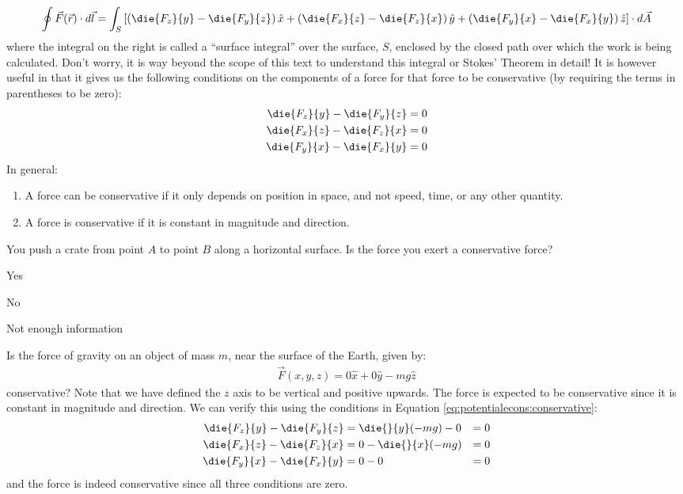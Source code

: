 \begin{align*}
\oint \vec F(\vec r) \cdot d\vec l = \int_S \left[\left(\die{F_z}{y}-\die{F_y}{z}\right)\hat x+ \left(\die{F_x}{z}-\die{F_z}{x}\right)\hat y + \left(\die{F_y}{x}-\die{F_x}{y}\right)\hat z \right]\cdot d\vec A
\end{align*}
where the integral on the right is called a ``surface integral'' over the surface, $S$, enclosed by the closed path over which the work is being calculated. Don't worry, it is way beyond the scope of this text to understand this integral or Stokes' Theorem in detail! It is however useful in that it gives us the following conditions on the components of a force for that force to be conservative (by requiring the terms in parentheses to be zero):
\begin{align}
\label{eq:potentialecons:conservative}
\die{F_z}{y}-\die{F_y}{z} &= 0 \nonumber\\
\die{F_x}{z}-\die{F_z}{x} &= 0\nonumber\\
\die{F_y}{x}-\die{F_x}{y} &= 0
\end{align}
In general:
\begin{enumerate}
\item A force can be conservative if it only depends on position in space, and not speed, time, or any other quantity.
\item A force is conservative if it is constant in magnitude and direction.
\end{enumerate}

\begin{checkpoint}
\begin{MCquestion}{You push a crate from point $A$ to point $B$ along a horizontal surface. Is the force you exert a conservative force?
}
\item Yes
\item No \correct
\item Not enough information
\end{MCquestion}
\end{checkpoint}

\begin{example}{\label{ex:potentialecons:gravity}Is the force of gravity on an object of mass $m$, near the surface of the Earth, given by:
\begin{align*}
\vec F(x,y,z) =0\hat x + 0\hat y -mg \hat z
\end{align*}
conservative? Note that we have defined the $z$ axis to be vertical and positive upwards.}
The force is expected to be conservative since it is constant in magnitude and direction. We can verify this using the conditions in Equation \ref{eq:potentialecons:conservative}:
\begin{align*}
\die{F_z}{y}-\die{F_y}{z} &= \die{}{y}(-mg) - 0 &= 0\\
\die{F_x}{z}-\die{F_z}{x} &= 0 - \die{}{x}(-mg) &= 0\\
\die{F_y}{x}-\die{F_x}{y} &= 0 - 0 &=0
\end{align*}
and the force is indeed conservative since all three conditions are zero.
\end{example}


